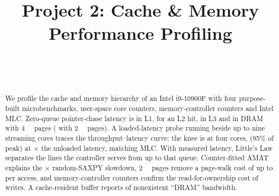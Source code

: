 \documentclass[11pt]{article}
\title{Project 2: Cache \& Memory Performance Profiling}
\author{\acsauthor\\[2pt]\small\acscourse\\\small\href{mailto:\acsemail}{\acsemail}}
\date{\acsdue}
\begin{document}
\maketitle

\begin{abstract}
  We profile the cache and memory hierarchy of an Intel i9-10900F with four purpose-built
  microbenchmarks, user-space core counters, memory-controller counters and Intel MLC.
  Zero-queue pointer-chase latency is  in L1, 
  for an L2 hit,  in L3 and  in DRAM with
  \qty{4}{\kibi\byte} pages ( with \qty{2}{\mebi\byte} pages). A
  loaded-latency probe running beside up to nine streaming cores traces the throughput--latency
  curve: the knee is at four cores,  (95\% of peak) at
  $\times$ the unloaded latency, matching MLC. With measured latency, Little's Law
  separates the  lines the controller serves from up to  that queue.
  Counter-fitted AMAT explains the $\times$ random-SAXPY slowdown, \qty{2}{\mebi\byte}
  pages remove a page-walk cost of up to  per access, and
  memory-controller counters confirm the read-for-ownership cost of writes. A cache-resident buffer
  reports  of nonexistent ``DRAM'' bandwidth.
\end{abstract}

\ifacsdraft{\small\setcounter{tocdepth}{1}\renewcommand{\addvspace}[1]{\vspace{1pt}}\tableofcontents}\clearpage\fi
















\printbibliography

\appendix

\end{document}
